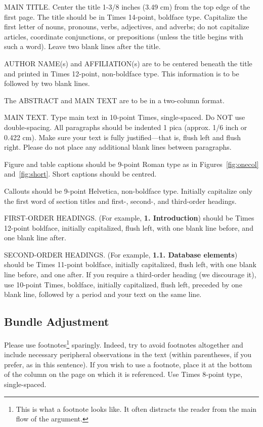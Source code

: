 \documentclass[10pt,twocolumn,letterpaper]{article}
\begin{document}
MAIN TITLE. Center the title 1-3/8 inches (3.49 cm) from the top edge of
the first page. The title should be in Times 14-point, boldface type.
Capitalize the first letter of nouns, pronouns, verbs, adjectives, and
adverbs; do not capitalize articles, coordinate conjunctions, or
prepositions (unless the title begins with such a word). Leave two blank
lines after the title.

AUTHOR NAME(s) and AFFILIATION(s) are to be centered beneath the title
and printed in Times 12-point, non-boldface type. This information is to
be followed by two blank lines.

The ABSTRACT and MAIN TEXT are to be in a two-column format.

MAIN TEXT. Type main text in 10-point Times, single-spaced. Do NOT use
double-spacing. All paragraphs should be indented 1 pica (approx. 1/6
inch or 0.422 cm). Make sure your text is fully justified---that is,
flush left and flush right. Please do not place any additional blank
lines between paragraphs.

Figure and table captions should be 9-point Roman type as in
Figures~\ref{fig:onecol} and~\ref{fig:short}.  Short captions should be centred.

\noindent Callouts should be 9-point Helvetica, non-boldface type.
Initially capitalize only the first word of section titles and first-,
second-, and third-order headings.

FIRST-ORDER HEADINGS. (For example, {\large \bf 1. Introduction})
should be Times 12-point boldface, initially capitalized, flush left,
with one blank line before, and one blank line after.

SECOND-ORDER HEADINGS. (For example, { \bf 1.1. Database elements})
should be Times 11-point boldface, initially capitalized, flush left,
with one blank line before, and one after. If you require a third-order
heading (we discourage it), use 10-point Times, boldface, initially
capitalized, flush left, preceded by one blank line, followed by a period
and your text on the same line.

\subsection{Bundle Adjustment}

Please use footnotes\footnote {This is what a footnote looks like.  It
often distracts the reader from the main flow of the argument.} sparingly.
Indeed, try to avoid footnotes altogether and include necessary peripheral
observations in
the text (within parentheses, if you prefer, as in this sentence).  If you
wish to use a footnote, place it at the bottom of the column on the page on
which it is referenced. Use Times 8-point type, single-spaced.
\end{document}
